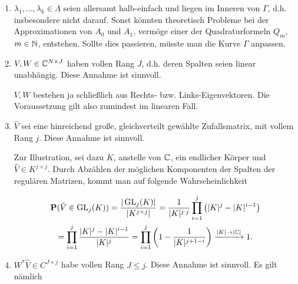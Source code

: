 \begin{enumerate}[label = \arabic*.]

    \item $\lambda_1, \dots, \lambda_k \in \Lambda$ seien allersamt halb-einfach und liegen im Inneren von $\Gamma$, d.h. insbesondere nicht darauf.
    Sonst könnten theoretisch Probleme bei der Approximationen von $A_0$ und $A_1$, vermöge einer der Quadraturformeln $Q_m$, $m \in \mathbb{N}$, entstehen.
    Sollte dies passieren, müsste man die Kurve $\Gamma$ anpassen.

    \item $V, W \in \mathbb{C}^{N \times J}$ haben vollen Rang $J$, d.h. deren Spalten seien linear unabhängig.
    Diese Annahme ist sinnvoll.

    $V, W$ bestehen ja schließlich aus Rechts- bzw. Links-Eigenvektoren.
    Die Voraussetzung gilt also zumindest im linearen Fall.

    \item $\hat V$ sei eine hinreichend große, gleichverteilt gewählte Zufallsmatrix, mit vollem Rang $j$.
    Diese Annahme ist sinnvoll.

    Zur Illustration, sei dazu $K$, anstelle von $\mathbb{C}$, ein endlicher Körper und $\hat V \in K^{j \times j}$.
    Durch Abzählen der möglichen Komponenten der Spalten der regulären Matrizen, kommt man auf folgende Wahrscheinlichkeit

    \begin{multline*}
        \mathbf{P}(\hat V \in \operatorname{GL}_j(K))
        =
        \frac
        {
            |\operatorname{GL}_j(K)|
        }{
            |K^{j \times j}|
        }
        =
        \frac{1}
        {
            |K|^{j \cdot j}
        }
        \prod_{i=1}^j
            {\left ( 
                |K|^j - |K|^{i-1}
             \right )} \\
        =
        \prod_{i=1}^j
            \frac
            {
                |K|^j - |K|^{i-1}
            }{
                |K|^j
            }
        =
        \prod_{i=1}^j
            {\left ( 
                1 - \frac{1}{|K|^{j + 1 - i}}
             \right )}
        \xrightarrow{|K| \to |\mathbb{C}|}
        1.
    \end{multline*}

    \item $W^\ast \hat V \in C^{J \times j}$ habe vollen Rang $J \leq j$.
    Diese Annahme ist sinnvoll.
    Es gilt nämlich


\end{enumerate}
